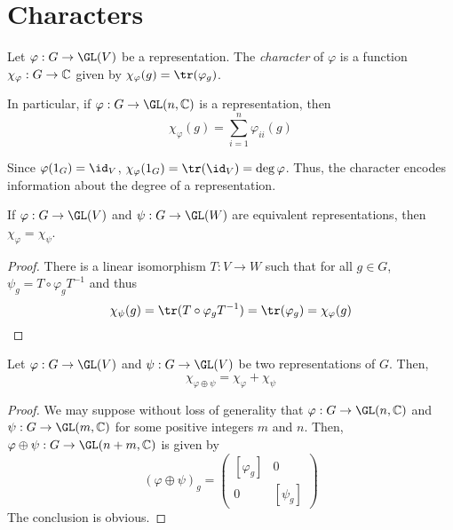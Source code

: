 \section{Characters}

\begin{definition}
    Let $\varphi: G\to\GL(V)$ be a representation. The \textit{character} of $\varphi$ is a function $\chi_\varphi: G\to\mathbb{C}$ given by $\chi_\varphi(g) = \tr(\varphi_g)$.
\end{definition}

In particular, if $\varphi: G\to\GL(n,\bbC)$ is a representation, then 
\begin{equation*}
    \chi_\varphi(g) = \sum_{i = 1}^n\varphi_{ii}(g)
\end{equation*}

\begin{remark}
    Since $\varphi(1_G) = \id_V$, $\chi_\varphi(1_G) = \tr(\id_V) = \deg\varphi$. Thus, the character encodes information about the degree of a representation.
\end{remark}

\begin{proposition}
    If $\varphi: G\to\GL(V)$ and $\psi: G\to\GL(W)$ are equivalent representations, then $\chi_\varphi = \chi_\psi$.
\end{proposition}
\begin{proof}
    There is a linear isomorphism $T: V\to W$ such that for all $g\in G$, $\psi_g = T\circ\varphi_gT^{-1}$ and thus 
    \begin{equation*}
        \chi_\psi(g) = \tr(T\circ\varphi_gT^{-1}) = \tr(\varphi_g) = \chi_\varphi(g)
    \end{equation*}
\end{proof}

\begin{lemma}
    Let $\varphi: G\to\GL(V)$ and $\psi: G\to\GL(V)$ be two representations of $G$. Then, 
    \begin{equation*}
        \chi_{\varphi\oplus\psi} = \chi_\varphi + \chi_\psi
    \end{equation*}
\end{lemma}
\begin{proof}
    We may suppose without loss of generality that $\varphi: G\to\GL(n,\bbC)$ and $\psi: G\to\GL(m,\bbC)$ for some positive integers $m$ and $n$. Then, $\varphi\oplus\psi: G\to\GL(n + m,\bbC)$ is given by 
    \begin{equation*}
        (\varphi\oplus\psi)_g = 
        \begin{pmatrix}
            [\varphi_g] & 0\\
            0 & [\psi_g]
        \end{pmatrix}
    \end{equation*}
    The conclusion is obvious.
\end{proof}

